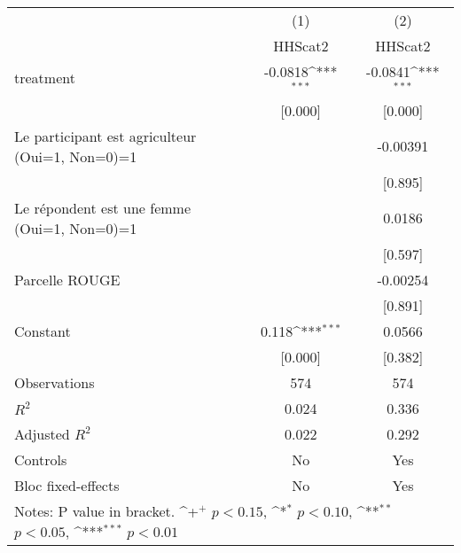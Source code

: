 {
\def\sym#1{\ifmmode^{#1}\else\(^{#1}\)\fi}
\begin{tabular*}{1.2\hsize}{@{\hskip\tabcolsep\extracolsep\fill}l*{2}{c}}
\cline{2-3}\cline{2-3}
     &\multicolumn{1}{c}{(1)}&\multicolumn{1}{c}{(2)}\\
     &\multicolumn{1}{c}{HHScat2}&\multicolumn{1}{c}{HHScat2}\\
\cline{2-3}
treatment&-0.0818\sym{***}&-0.0841\sym{***}\\
     &[0.000]         &[0.000]         \\
[1em]
Le participant est agriculteur (Oui=1, Non=0)=1&           &-0.00391         \\
     &           &[0.895]         \\
[1em]
Le répondent est une femme (Oui=1, Non=0)=1&           &0.0186         \\
     &           &[0.597]         \\
[1em]
Parcelle ROUGE&           &-0.00254         \\
     &           &[0.891]         \\
[1em]
Constant&0.118\sym{***}&0.0566         \\
     &[0.000]         &[0.382]         \\
\cline{2-3}
Observations&574         &574         \\
\(R^{2}\)&0.024         &0.336         \\
Adjusted \(R^{2}\)&0.022         &0.292         \\
Controls&No         &Yes         \\
Bloc fixed-effects&No         &Yes         \\
\cline{2-3}\cline{2-3}
\multicolumn{3}{p{1.0\textwidth}}{\footnotesize Notes: P value in bracket. \sym{+} \(p<0.15\), \sym{*} \(p<0.10\), \sym{**} \(p<0.05\), \sym{***} \(p<0.01\)}\\
\end{tabular*}
}
